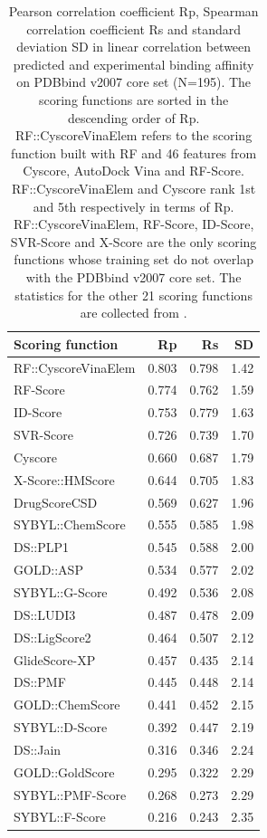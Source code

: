 \documentclass[10pt,conference,compsocconf]{IEEEtran}
\begin{document}
\begin{table}
\centering
\begin{tabular*}{\linewidth}{@{\extracolsep{\fill}}lrrr}
\toprule
Scoring function & Rp & Rs & SD\\
\midrule
RF::CyscoreVinaElem & 0.803 & 0.798 & 1.42\\
RF-Score & 0.774 & 0.762 & 1.59\\
ID-Score & 0.753 & 0.779 & 1.63\\
SVR-Score & 0.726 & 0.739 & 1.70\\
Cyscore & 0.660 & 0.687 & 1.79\\
X-Score::HMScore & 0.644 & 0.705 & 1.83\\
DrugScoreCSD & 0.569 & 0.627 & 1.96\\
SYBYL::ChemScore & 0.555 & 0.585 & 1.98\\
DS::PLP1 & 0.545 & 0.588 & 2.00\\
GOLD::ASP & 0.534 & 0.577 & 2.02\\
SYBYL::G-Score & 0.492 & 0.536 & 2.08\\
DS::LUDI3 & 0.487 & 0.478 & 2.09\\
DS::LigScore2 & 0.464 & 0.507 & 2.12\\
GlideScore-XP & 0.457 & 0.435 & 2.14\\
DS::PMF & 0.445 & 0.448 & 2.14\\
GOLD::ChemScore & 0.441 & 0.452 & 2.15\\
SYBYL::D-Score & 0.392 & 0.447 & 2.19\\
DS::Jain & 0.316 & 0.346 & 2.24\\
GOLD::GoldScore & 0.295 & 0.322 & 2.29\\
SYBYL::PMF-Score & 0.268 & 0.273 & 2.29\\
SYBYL::F-Score & 0.216 & 0.243 & 2.35\\
\bottomrule
\end{tabular*}
\caption{Pearson correlation coefficient Rp, Spearman correlation coefficient Rs and standard deviation SD in linear correlation between predicted and experimental binding affinity on PDBbind v2007 core set (N=195). The scoring functions are sorted in the descending order of Rp. RF::CyscoreVinaElem refers to the scoring function built with RF and 46 features from Cyscore, AutoDock Vina and RF-Score. RF::CyscoreVinaElem and Cyscore rank 1st and 5th respectively in terms of Rp. RF::CyscoreVinaElem, RF-Score, ID-Score, SVR-Score and X-Score are the only scoring functions whose training set do not overlap with the PDBbind v2007 core set. The statistics for the other 21 scoring functions are collected from \cite{1313,1362,564,1305,1295}.}
\label{tbl:trn1105tst195}
\end{table}
\end{document}
